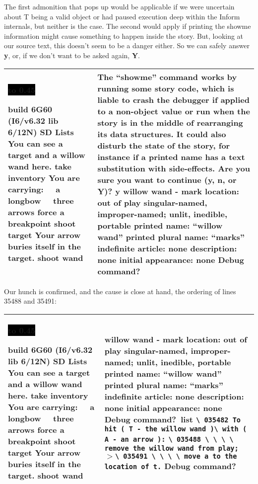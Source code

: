 \documentclass{book}
\newcommand{\n}{\hspace*{\fill}\newline}
\newcommand{\terp}[2]{\begin{center}\begin{tabular}{p{0.45\textwidth}|p{0.45\textwidth}}\midrule #1&#2\\\midrule\end{tabular}\end{center}}
\newcommand{\glkheading}[1]{\textbf{#1}}
\newcommand{\glkinput}[1]{\textbf{#1}}
\newcommand{\glkstatusline}[2]{\centerline{\colorbox{black}{\hbox to 0.45\textwidth{\textcolor{white}{#1\hfil #2}}}}}
\newcommand{\storyprompt}{\raisebox{1.5pt}{\(>\)}}
\newcommand{\cursor}{\raisebox{-1.5pt}{\RectangleThin}}
\newcommand{\markedindent}{\(>\)}
\newcommand{\unmarkedindent}{\hphantom{\(>\)}}
\begin{document}
The first admonition that pops up would be applicable if we were uncertain about
T being a valid object or had paused execution deep within the Inform internals,
but neither is the case.  The second would apply if printing the showme
information might cause something to happen inside the story.  But, looking at
our source text, this doesn't seem to be a danger either.  So we can safely
answer \glkinput{y}, or, if we don't want to be asked again, \glkinput{Y}.

\terp{\glkstatusline{Lists}{0/3}\n
  build 6G60 (I6/v6.32 lib 6/12N) SD\n
  \n
  \glkheading{Lists}\n
  You can see a target and a willow wand here.\n
  \n
  \storyprompt\glkinput{take inventory}\n
  You are carrying:\n
  \null\ \ a longbow\n
  \null\ \ three arrows\n
  \n
  \storyprompt\glkinput{force a breakpoint}\n
  \storyprompt\glkinput{shoot target}\n
  Your arrow buries itself in the target.\n
  \n
  \storyprompt\glkinput{shoot wand}\n
  \n
  [** Programming error: tried to ``move'' arrow to nothing **]}{%
  \n
  The ``showme'' command works by running some story code, which is liable to crash the debugger if applied to a non-object value or run when the story is in the middle of rearranging its data structures.  It could also disturb the state of the story, for instance if a printed name has a text substitution with side-effects.  Are you sure you want to continue (y, n, or Y)? \glkinput{y}\n
  \n
  willow wand - mark\n
  location: out of play\n
  singular-named, improper-named; unlit, inedible, portable\n
  printed name: ``willow wand''\n
  printed plural name: ``marks''\n
  indefinite article: none\n
  description: none\n
  initial appearance: none\n
  \n
  Debug command?\ \cursor}

Our hunch is confirmed, and the cause is close at hand, the ordering of lines
35488 and 35491:

\terp{\glkstatusline{Lists}{0/3}\n
  build 6G60 (I6/v6.32 lib 6/12N) SD\n
  \n
  \glkheading{Lists}\n
  You can see a target and a willow wand here.\n
  \n
  \storyprompt\glkinput{take inventory}\n
  You are carrying:\n
  \null\ \ a longbow\n
  \null\ \ three arrows\n
  \n
  \storyprompt\glkinput{force a breakpoint}\n
  \storyprompt\glkinput{shoot target}\n
  Your arrow buries itself in the target.\n
  \n
  \storyprompt\glkinput{shoot wand}\n
  \n
  [** Programming error: tried to ``move'' arrow to nothing **]}{%
  \n
  willow wand - mark\n
  location: out of play\n
  singular-named, improper-named; unlit, inedible, portable\n
  printed name: ``willow wand''\n
  printed plural name: ``marks''\n
  indefinite article: none\n
  description: none\n
  initial appearance: none\n
  \n
  Debug command?\ \glkinput{list}\n
  \n
  \unmarkedindent \lstinline{\ 035482 To hit ( T - the willow wand )}\lstinline{\ with ( A - an arrow ):}\n
  \unmarkedindent \lstinline{\ 035488 \ \ \ \ remove the willow wand from play;}\n
  \markedindent \lstinline{\ 035491 \ \ \ \ move a to the location of t.}\n
  \n
  Debug command?\ \cursor}
\end{document}
